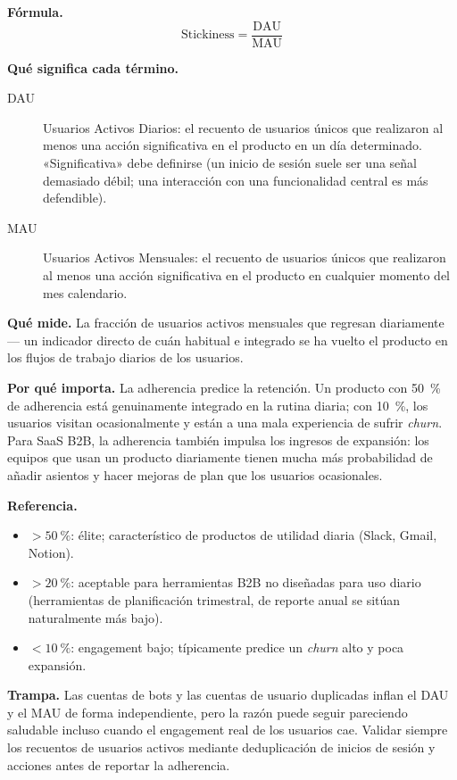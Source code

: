\textbf{Fórmula.}
\[
  \text{Stickiness} = \frac{\mathrm{DAU}}{\mathrm{MAU}}
\]

\textbf{Qué significa cada término.}
\begin{description}
  \item[DAU] Usuarios Activos Diarios: el recuento de usuarios únicos que realizaron al menos
    una acción significativa en el producto en un día determinado. «Significativa» debe
    definirse (un inicio de sesión suele ser una señal demasiado débil; una interacción con
    una funcionalidad central es más defendible).
  \item[MAU] Usuarios Activos Mensuales: el recuento de usuarios únicos que realizaron al
    menos una acción significativa en el producto en cualquier momento del mes calendario.
\end{description}

\textbf{Qué mide.} La fracción de usuarios activos mensuales que regresan diariamente ---
un indicador directo de cuán habitual e integrado se ha vuelto el producto en los flujos de
trabajo diarios de los usuarios.

\textbf{Por qué importa.} La adherencia predice la retención. Un producto con
\qty{50}{\percent} de adherencia está genuinamente integrado en la rutina diaria; con
\qty{10}{\percent}, los usuarios visitan ocasionalmente y están a una mala experiencia de
sufrir \emph{churn}. Para SaaS B2B, la adherencia también impulsa los ingresos de expansión:
los equipos que usan un producto diariamente tienen mucha más probabilidad de añadir asientos
y hacer mejoras de plan que los usuarios ocasionales.

\textbf{Referencia.}
\begin{itemize}
  \item $>\qty{50}{\percent}$: élite; característico de productos de utilidad diaria (Slack,
    Gmail, Notion).
  \item $>\qty{20}{\percent}$: aceptable para herramientas B2B no diseñadas para uso diario
    (herramientas de planificación trimestral, de reporte anual se sitúan naturalmente más
    bajo).
  \item $<\qty{10}{\percent}$: engagement bajo; típicamente predice un \emph{churn} alto y
    poca expansión.
\end{itemize}

\textbf{Trampa.} Las cuentas de bots y las cuentas de usuario duplicadas inflan el DAU y el
MAU de forma independiente, pero la razón puede seguir pareciendo saludable incluso cuando
el engagement real de los usuarios cae. Validar siempre los recuentos de usuarios activos
mediante deduplicación de inicios de sesión y acciones antes de reportar la adherencia.

